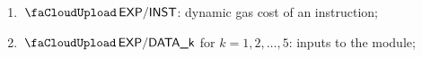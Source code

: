 \begin{enumerate}[resume]
	\item $\miscExpInstruction$:
		dynamic gas cost of an  instruction;
	\item $\miscExpDataCol{k}$ for $k=1,2,\dots,5$:
		inputs to the \expMod{} module;
\end{enumerate}
